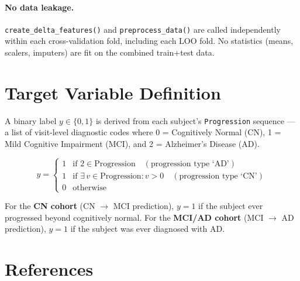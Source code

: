 \documentclass[11pt]{article}
\begin{document}
\paragraph{No data leakage.}  \texttt{create\_delta\_features()} and \texttt{preprocess\_data()} are called independently within each cross-validation fold, including each LOO fold.  No statistics (means, scalers, imputers) are fit on the combined train+test data.

\section{Target Variable Definition}
\label{sec:target}

A binary label $y \in \{0, 1\}$ is derived from each subject's \texttt{Progression} sequence --- a list of visit-level diagnostic codes where 0 = Cognitively Normal (CN), 1 = Mild Cognitive Impairment (MCI), and 2 = Alzheimer's Disease (AD).

\begin{equation}
y =
\begin{cases}
1 & \text{if } 2 \in \text{Progression} \quad (\text{progression type `AD'}) \\
1 & \text{if } \exists\, v \in \text{Progression} : v > 0 \quad (\text{progression type `CN'}) \\
0 & \text{otherwise}
\end{cases}
\label{eq:target}
\end{equation}

For the \textbf{CN cohort} (CN $\to$ MCI prediction), $y = 1$ if the subject ever progressed beyond cognitively normal.  For the \textbf{MCI/AD cohort} (MCI $\to$ AD prediction), $y = 1$ if the subject was ever diagnosed with AD.

\section*{References}
\end{document}
